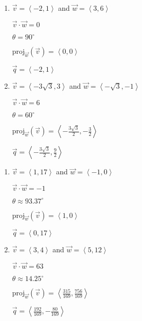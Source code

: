  \begin{multicols}{2} \raggedcolumns 
\begin{enumerate}
\setcounter{enumi}{\value{HW}}
\item $\vec{v} = \left\langle -2,1 \right\rangle$ and $\vec{w} = \left\langle 3,6 \right\rangle$

 $\vec{v} \cdot \vec{w} = 0$

 $\theta =  90^{\circ}$ 

 $\text{proj}_{\vec{w}}(\vec{v}) = \left\langle 0, 0 \right\rangle$

 $\vec{q} = \left\langle -2, 1 \right\rangle$
 
 \vfill
 
\item $\vec{v} = \left\langle -3\sqrt{3}, 3\right\rangle$ and $\vec{w} = \left\langle -\sqrt{3}, -1 \right\rangle$

 $\vec{v} \cdot \vec{w} = 6$

 $\theta =  60^{\circ}$ 

 $\text{proj}_{\vec{w}}(\vec{v}) = \left\langle -\frac{3\sqrt{3}}{2}, -\frac{3}{2} \right\rangle$

 $\vec{q} = \left\langle -\frac{3\sqrt{3}}{2}, \frac{9}{2} \right\rangle$ 

 
\setcounter{HW}{\value{enumi}}
\end{enumerate}
\end{multicols}
 
 
\begin{multicols}{2} \raggedcolumns 
\begin{enumerate}
\setcounter{enumi}{\value{HW}}


\item $\vec{v} = \left\langle 1, 17 \right\rangle$ and $\vec{w} = \left\langle -1, 0 \right\rangle$

 $\vec{v} \cdot \vec{w} = -1$

 $\theta \approx  93.37^{\circ}$ 

 $\text{proj}_{\vec{w}}(\vec{v}) = \left\langle 1, 0 \right\rangle$

 $\vec{q} = \left\langle 0, 17 \right\rangle$

\vfill

\item $\vec{v} = \left\langle 3, 4 \right\rangle$ and $\vec{w} = \left\langle 5, 12 \right\rangle$

 $\vec{v} \cdot \vec{w} = 63$

 $\theta  \approx  14.25^{\circ}$ 

 $\text{proj}_{\vec{w}}(\vec{v}) = \left\langle \frac{315}{169}, \frac{756}{169} \right\rangle$

 $\vec{q} = \left\langle \frac{192}{169}, -\frac{80}{169} \right\rangle$
 
\setcounter{HW}{\value{enumi}}
\end{enumerate}
\end{multicols}
 
